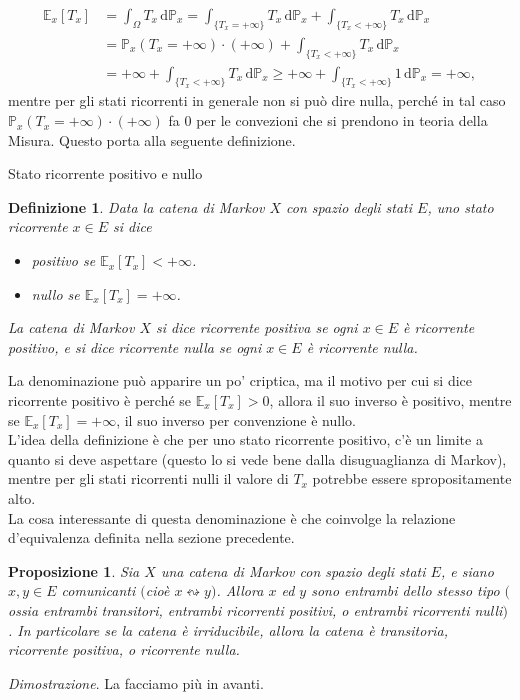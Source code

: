 \documentclass[11pt]{book}
\makeatletter
\theoremstyle{Definizione}
\newtheorem*{mydef}{Definizione}
\theoremstyle{TeoremaProposizioneLemmaCorollario}
\newtheorem{mypropo}[myteo]{Proposizione}
\theoremstyle{OsservazioneNota}
\renewenvironment{proof}[1][\proofname]{\par
  \normalfont \topsep6\p@\@plus6\p@\relax
  \trivlist
  \item[\hskip\labelsep
        \itshape
    #1\@addpunct{.}]\ignorespaces
}{%
  \endtrivlist\@endpefalse
}
\renewcommand{\P}{\mathbb{P}}
\renewcommand{\d}{\mathrm{d}}
\newcommand{\E}{\mathbb{E}}
\newcommand{\comunica}{\leftrightsquigarrow}
\renewenvironment{proof}{\textsl{Dimostrazione}.}{}
\makeatother
\begin{document}
\begin{align*}
\E_x[T_x] &= \int_{\Omega} T_x \, \d \P_x = \int_{\{T_x = +\infty\}} T_x \,\d \P_x + \int_{\{T_x < +\infty\}} T_x \,\d \P_x \\
&= \P_x(T_x = +\infty)\cdot (+\infty) + \int_{\{T_x < +\infty\}} T_x \,\d\P_x\\
&= +\infty + \int_{\{T_x < +\infty\}} T_x \,\d\P_x \geq +\infty + \int_{\{T_x<+\infty\}} 1 \,\d\P_x = +\infty,
\end{align*}
mentre per gli stati ricorrenti in generale non si può dire nulla, perché in tal caso $\P_x(T_x = +\infty)\cdot (+\infty)$ fa 0 per le convezioni che si prendono in teoria della Misura. Questo porta alla seguente definizione.
\begin{boxdef}{Stato ricorrente positivo e nullo}
\begin{mydef}
Data la catena di Markov $X$ con spazio degli stati $E$, uno stato ricorrente $x\in E$ si dice
\begin{itemize}
\item positivo se $\E_x[T_x] <+\infty$.
\item nullo se $\E_x[T_x] = +\infty$.
\end{itemize}
La catena di Markov $X$ si dice ricorrente positiva se ogni $x\in E$ è ricorrente positivo, e si dice ricorrente nulla se ogni $x\in E$ è ricorrente nulla.
\end{mydef}
\end{boxdef}
\noindent
La denominazione può apparire un po' criptica, ma il motivo per cui si dice ricorrente positivo è perché se $\E_x[T_x] > 0$, allora il suo inverso è positivo, mentre se $\E_x[T_x] = +\infty$, il suo inverso per convenzione è nullo.\\
L'idea della definizione è che per uno stato ricorrente positivo, c'è un limite a quanto si deve aspettare (questo lo si vede bene dalla disuguaglianza di Markov), mentre per gli stati ricorrenti nulli il valore di $T_x$ potrebbe essere spropositamente alto.\\
La cosa interessante di questa denominazione è che coinvolge la relazione d'equivalenza definita nella sezione precedente.
\begin{boxpro}
\begin{mypropo}
Sia $X$ una catena di Markov con spazio degli stati $E$, e siano $x,y\in E$ comunicanti $($cioè $x \comunica y)$. Allora $x$ ed $y$ sono entrambi dello stesso tipo $($ossia entrambi transitori, entrambi ricorrenti positivi, o entrambi ricorrenti nulli$)$. In particolare se la catena è irriducibile, allora la catena è transitoria, ricorrente positiva, o ricorrente nulla.
\end{mypropo}
\tcblower
\begin{proof}
La facciamo più in avanti.
\end{proof}
\end{boxpro}
\end{document}
